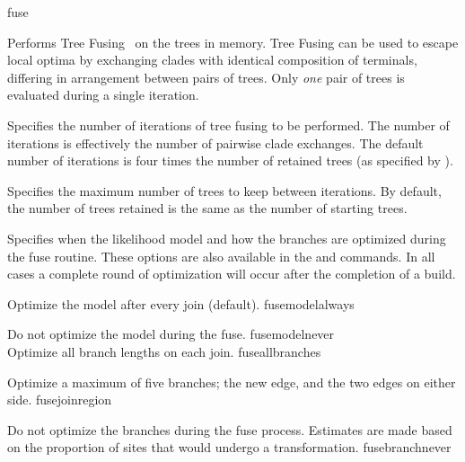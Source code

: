 \begin{command}{fuse}{}


\begin{poydescription}
Performs Tree Fusing~\cite{goloboff1999} on the trees in memory. 
Tree Fusing can be used to escape local optima
by exchanging clades with identical composition of terminals, differing in arrangement
between pairs of trees. Only \emph{one} pair of trees is evaluated during a single iteration.
\end{poydescription}

\begin{arguments}
{Specifies the number of iterations of tree fusing to be performed. The
number of iterations is effectively the number of pairwise clade exchanges. 
The default number of iterations is four times the number of retained
trees (as specified by ).}
{}

{Specifies the maximum number of trees to keep between iterations.
By default, the number of trees retained is the same as the number
of starting trees.}
{}

{Specifies when the likelihood model and how the branches are
optimized during the fuse routine. These options are also available
in the  and  commands. In all
cases a complete round of optimization will occur after the
completion of a build.

\begin{description}

{Optimize the model after every join (default).}
{fusemodelalways}

{Do not optimize the model during the fuse.}
{fusemodelnever}
\\
{Optimize all branch lengths on each join.}
{fuseallbranches}

{Optimize a maximum of five branches; the new edge, and the two
edges on either side.}
{fusejoinregion}

{Do not optimize the branches during the fuse process.
Estimates are made based on the proportion of sites that
would undergo a transformation.}
{fusebranchnever}


\end{description}}
\end{arguments}
\end{command}
